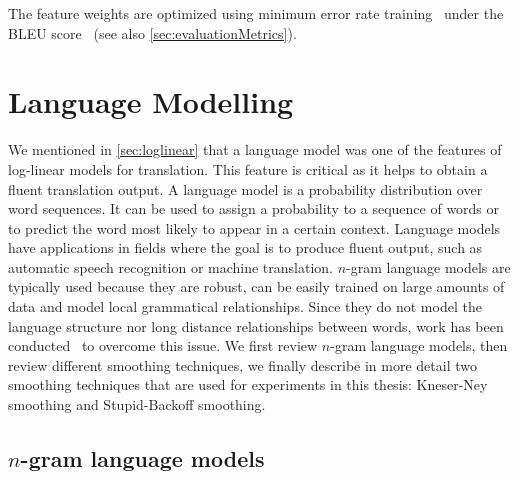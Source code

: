     The feature weights are optimized using minimum error rate training~\citep{och:2003:ACL} under the BLEU
    score~\citep{papineni-roukos-ward-zhu:2002:ACL} (see
    also \autoref{sec:evaluationMetrics}).

\section{Language Modelling}
\label{sec:languageModelling}



We mentioned in \autoref{sec:loglinear} that a language model was one of the features of
log-linear models for translation. This feature is critical as it helps to obtain a fluent
translation output. A language model is a probability distribution over word sequences. It can be used to assign
a probability to a sequence of words or to predict the word most likely to appear in a certain context.
Language models have applications in fields where the goal is to produce fluent output, such
as automatic speech recognition or machine translation.
$n$-gram language models are typically used because they are 
robust, can be easily trained on large amounts of data and model local grammatical relationships.
Since they do not model the language structure nor long distance relationships between words, work
has been conducted~\citep{shen-xu-weischedel:2008:ACL} to overcome this issue. %
We first review $n$-gram language models, then review different smoothing techniques, we finally
describe in more detail two smoothing techniques
that are used for experiments in this thesis: Kneser-Ney smoothing
and Stupid-Backoff smoothing.

\subsection{$n$-gram language models}
\label{sec:ngramLanguageModels}

